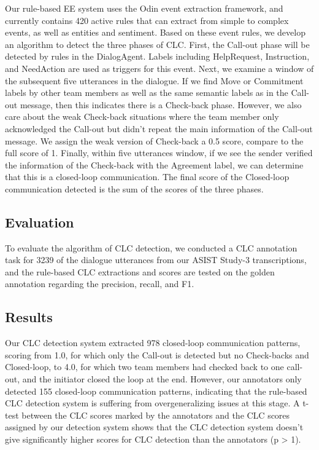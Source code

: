 Our rule-based EE system uses the Odin \cite{valenzuela-escarcega-etal-2016-odins}
event extraction framework, and currently contains 420 active rules that can
extract from simple to complex events, as well as entities and sentiment. Based
on these event rules, we develop an algorithm to detect the three phases of
CLC. First, the Call-out phase will be detected by rules in the DialogAgent.
Labels including HelpRequest, Instruction, and NeedAction are used as triggers
for this event. Next, we examine a window of the subsequent five utterances in
the dialogue.  If we find Move or Commitment labels by other team members as
well as the same semantic labels as in the Call-out message, then this
indicates there is a Check-back phase. However, we also care about the weak
Check-back situations where the team member only acknowledged the Call-out but
didn’t repeat the main information of the Call-out message. We assign the weak
version of Check-back a 0.5 score, compare to the full score of 1.  Finally,
within five utterances window, if we see the sender verified the information of
the Check-back with the Agreement label, we can determine that this is a
closed-loop communication. The final score of the Closed-loop communication
detected is the sum of the scores of the three phases.

\subsection{Evaluation}

To evaluate the algorithm of CLC detection, we conducted a CLC annotation task
for 3239 of the dialogue utterances from our ASIST Study-3 transcriptions, and
the rule-based CLC extractions and scores are tested on the golden annotation
regarding the precision, recall, and F1.


\subsection{Results}

Our CLC detection system extracted 978 closed-loop communication patterns,
scoring from 1.0, for which only the Call-out is detected but no Check-backs
and Closed-loop, to 4.0, for which two team members had checked back to one
call-out, and the initiator closed the loop at the end. However, our annotators
only detected 155 closed-loop communication patterns, indicating that the
rule-based CLC detection system is suffering from overgeneralizing issues at
this stage. A t-test between the CLC scores marked by the annotators and the
CLC scores assigned by our detection system shows that the CLC detection system
doesn’t give significantly higher scores for CLC detection than the annotators
(p > 1). 

